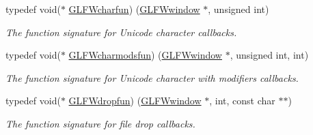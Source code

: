 \begin{DoxyCompactItemize}
typedef void($\ast$ \hyperlink{group__input_gabf24451c7ceb1952bc02b17a0d5c3e5f}{G\+L\+F\+Wcharfun}) (\hyperlink{group__window_ga3c96d80d363e67d13a41b5d1821f3242}{G\+L\+F\+Wwindow} $\ast$, unsigned int)
\begin{DoxyCompactList}\small\item\em The function signature for Unicode character callbacks. \end{DoxyCompactList}\item 
typedef void($\ast$ \hyperlink{group__input_gae36fb6897d2b7df9b128900c8ce9c507}{G\+L\+F\+Wcharmodsfun}) (\hyperlink{group__window_ga3c96d80d363e67d13a41b5d1821f3242}{G\+L\+F\+Wwindow} $\ast$, unsigned int, int)
\begin{DoxyCompactList}\small\item\em The function signature for Unicode character with modifiers callbacks. \end{DoxyCompactList}\item 
typedef void($\ast$ \hyperlink{group__input_gab71f4ca80b651462852e601caf308c4a}{G\+L\+F\+Wdropfun}) (\hyperlink{group__window_ga3c96d80d363e67d13a41b5d1821f3242}{G\+L\+F\+Wwindow} $\ast$, int, const char $\ast$$\ast$)
\begin{DoxyCompactList}\small\item\em The function signature for file drop callbacks. \end{DoxyCompactList}\end{DoxyCompactItemize}
